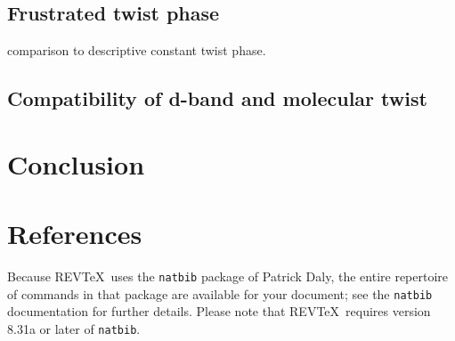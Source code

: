 \documentclass[%
 reprint,
 amsmath,amssymb,
 aps,
]{revtex4-1}
\begin{document}
\subsection{\label{sub:nonlinear}Frustrated twist phase}
comparison to descriptive constant twist phase.
\subsection{\label{sub:strain}Compatibility of d-band and molecular twist}




\section{\label{sec:conclusion}Conclusion}
\section{\label{sec:references}References}

Because REV\TeX\ uses the \verb+natbib+ package of Patrick Daly, 
the entire repertoire of commands in that package are available for your document;
see the \verb+natbib+ documentation for further details. Please note that
REV\TeX\ requires version 8.31a or later of \verb+natbib+.
\end{document}
